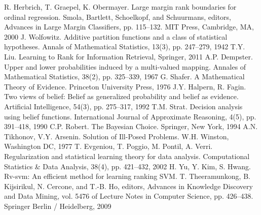 \documentclass[12pt,a4paper,oneside]{article}
\begin{document}
\begin{thebibliography}{9}
	 R. Herbrich, T. Graepel, K. Obermayer. Large margin rank boundaries for ordinal regression. Smola, Bartlett, Schoelkopf, and Schuurmans, editors, Advances in Large Margin Classifiers, pp. 115–132. MIT Press, Cambridge, MA, 2000%
	 J. Wolfowitz. Additive partition functions and a class of statistical hypotheses. Annals of Mathematical Statistics, 13(3), pp. 247–279, 1942%
	 T.Y. Liu. Learning to Rank for Information Retrieval, Springer, 2011%
	 A.P. Dempster. Upper and lower probabilities induced by a multi-valued mapping. Annales of Mathematical Statistics, 38(2), pp. 325–339, 1967%
	 G. Shafer. A Mathematical Theory of Evidence. Princeton University Press, 1976%
	 J.Y. Halpern, R. Fagin. Two views of belief: Belief as generalized probability and belief as evidence. Artificial Intelligence, 54(3), pp. 275–317, 1992%
	 T.M. Strat. Decision analysis using belief functions. International Journal of Approximate Reasoning, 4(5), pp. 391–418, 1990%
	 C.P. Robert. The Bayesian Choice. Springer, New York, 1994%
	 A.N. Tikhonov, V.Y. Arsenin. Solution of Ill-Posed Problems. W.H. Winston, Washington DC, 1977%
	 T. Evgeniou, T. Poggio, M. Pontil, A. Verri. Regularization and statistical learning theory for data analysis. Computational Statistics \& Data Analysis, 38(4), pp. 421–432, 2002%
	 H. Yu, Y. Kim, S. Hwang. Rv-svm: An efficient method for learning ranking SVM. T. Theeramunkong, B. Kijsirikul, N. Cercone, and T.-B. Ho, editors, Advances in Knowledge Discovery and Data Mining, vol. 5476 of Lecture Notes in Computer Science, pp. 426–438. Springer Berlin / Heidelberg, 2009%
\end{thebibliography}
\end{document}
